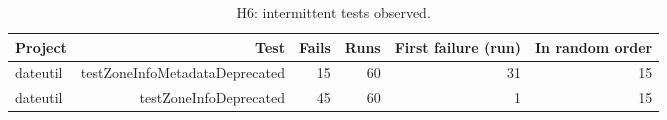\begin{table}[t]
\centering\small
\begin{tabular}{lrrrrr}
\toprule
Project & Test & Fails & Runs & First failure (run) & In random order \\
\midrule
dateutil & testZoneInfoMetadataDeprecated & 15 & 60 & 31 & 15 \\
dateutil & testZoneInfoDeprecated & 45 & 60 & 1 & 15 \\
\bottomrule
\end{tabular}
\caption{H6: intermittent tests observed.}
\label{tab:h6detail}
\end{table}

